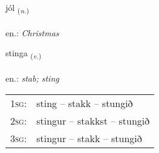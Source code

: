 \documentclass[frontgrid, backgrid]{flacards}\usepackage[]{graphicx}\usepackage[]{xcolor}
\begin{document}
\renewcommand{\flhead}{\vskip5pt \fboxsep=0pt {\small\bfseries\footnotesize Nafnorð | Noun}}
\renewcommand{\fcfoot}{\vskip5pt \fboxsep=0pt \hspace{2pt}{\small\bfseries\footnotesize 2K}}

\renewcommand{\blhead}{\vskip5pt {\small\bfseries\footnotesize Nafnorð | Noun }}
\renewcommand{\bcfoot}{\vskip5pt \hspace{2pt}{\small\bfseries\footnotesize 2K}}


{jól \small{\textsubscript{(\textit{n.})}} \\[1ex] %
\textphonetic{[jouːl]} \\
en.: \emph{Christmas} \\  [2ex]
\renewcommand*{\arraystretch}{0.8}
}

\renewcommand{\flhead}{\vskip5pt \fboxsep=0pt {\small\bfseries\footnotesize Sagnorð | Verb}}
\renewcommand{\fcfoot}{\vskip5pt \fboxsep=0pt \hspace{2pt}{\small\bfseries\footnotesize 2K}}

\renewcommand{\blhead}{\vskip5pt {\small\bfseries\footnotesize Sagnorð | Verb }}
\renewcommand{\bcfoot}{\vskip5pt \hspace{2pt}{\small\bfseries\footnotesize 2K}}


{stinga \small{\textsubscript{(\textit{v.})}} \\[1ex] %
\textphonetic{[stiŋka]} \\
en.: \emph{stab; sting} \\  [2ex]
\renewcommand*{\arraystretch}{0.8}
\begin{tabular}{p{1cm}l}
\textsc{1sg}: & sting -- stakk -- stungið \\ 
\textsc{2sg}: & stingur -- stakkst -- stungið \\ 
\textsc{3sg}: & stingur -- stakk -- stungið \\ 
\end{tabular}
}
\end{document}
